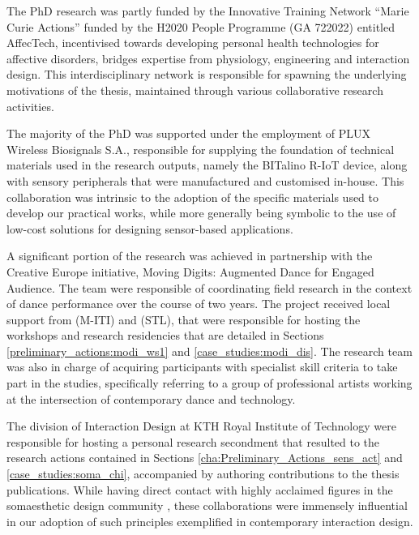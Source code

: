     
        The PhD research was partly funded by the Innovative Training Network “Marie Curie Actions” funded by the H2020 People Programme (GA 722022) entitled AffecTech, incentivised towards developing personal health technologies for affective disorders, bridges expertise from physiology, engineering and interaction design. This interdisciplinary network is responsible for spawning the underlying motivations of the thesis, maintained through various collaborative research activities.     
    
    
        The majority of the PhD was supported under the employment of PLUX Wireless Biosignals S.A., responsible for supplying the foundation of technical materials used in the research outputs, namely the BITalino R-IoT device, along with sensory peripherals that were manufactured and customised in-house. This collaboration was intrinsic to the adoption of the specific materials used to develop our practical works, while more generally being symbolic to the use of low-cost solutions for designing sensor-based applications.
        
    
        A significant portion of the research was achieved in partnership with the Creative Europe initiative, Moving Digits: Augmented Dance for Engaged Audience. The team were responsible of coordinating field research in the context of dance performance over the course of two years. The project received local support from (M-ITI) and (STL), that were responsible for hosting the workshops and research residencies that are detailed in Sections \ref{preliminary_actions:modi_ws1} and \ref{case_studies:modi_dis}. The research team was also in charge of acquiring participants with specialist skill criteria to take part in the studies, specifically referring to a group of professional artists working at the intersection of contemporary dance and technology.
        
        
        The division of Interaction Design at KTH Royal Institute of Technology were responsible for hosting a personal research secondment that resulted to the research actions contained in Sections \ref{cha:Preliminary_Actions_sens_act} and \ref{case_studies:soma_chi}, accompanied by authoring contributions to the thesis publications. While having direct contact with highly acclaimed figures in the somaesthetic design community \cite{hook_designing_2018}, these collaborations were immensely influential in our adoption of such principles exemplified in contemporary interaction design. 

